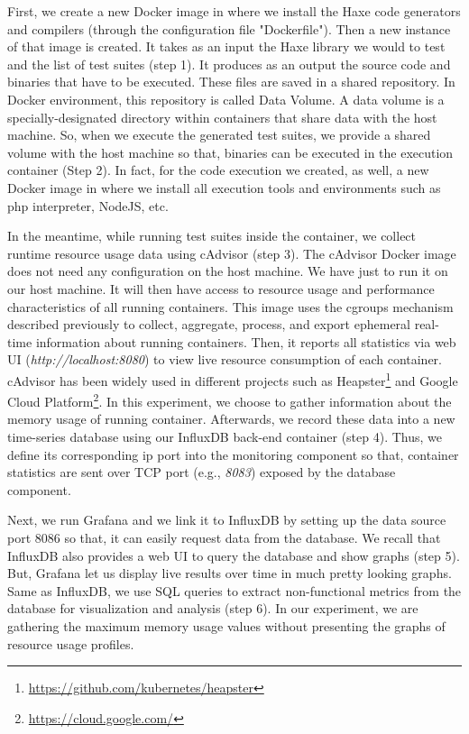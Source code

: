 First, we create a new Docker image in where we install the Haxe code generators and compilers (through the configuration file "Dockerfile"). Then a new instance of that image is created. It takes as an input the Haxe library we would to test and the list of test suites (step 1). It produces as an output the source code and binaries that have to be executed. These files are saved in a shared repository.
In Docker environment, this repository is called Data Volume. A data volume is a specially-designated directory within containers that share data with the host machine. So, when
we execute the generated test suites, we provide a shared volume with
the host machine so that, binaries can be executed in the execution container (Step 2). In fact, for the code execution we created, as well, a new Docker image in where we install all execution tools and environments such as php interpreter, NodeJS, etc. 

In the meantime, while running test suites inside the container, we collect runtime resource usage data using cAdvisor (step 3). The cAdvisor Docker image does not need any configuration on the host machine. We have just to run it on our host machine. It will then have access to resource usage and performance characteristics of all running containers. This image uses the cgroups mechanism described previously to collect, aggregate, process, and export ephemeral real-time information about running containers. Then, it reports all statistics via web UI (\textit{http://localhost:8080}) to view live resource consumption of each container. cAdvisor has been widely used in different projects such as Heapster\footnote{\url{https://github.com/kubernetes/heapster}} and Google Cloud Platform\footnote{\url{https://cloud.google.com/}}. In this experiment, we choose to gather information about the memory usage of running container.
Afterwards, we record these data into a new time-series database using our InfluxDB back-end container (step 4). Thus, we define its corresponding ip port into the monitoring component so that, container statistics are sent over TCP port (e.g., \textit{8083}) exposed by the database component. 

Next, we run Grafana and we link it to InfluxDB by setting up the data source port 8086 so that, it can easily request data from the database. We recall that InfluxDB also provides a web UI to query the database and show graphs (step 5). But, Grafana let us display live results over time in much pretty looking graphs. Same as InfluxDB, we use SQL queries to extract non-functional metrics from the database for visualization and analysis (step 6). In our experiment, we are gathering the maximum memory usage values without presenting the graphs of resource usage profiles.
 
